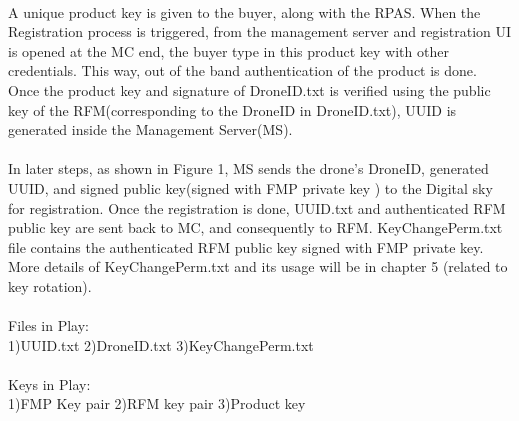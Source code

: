 \documentclass[18pt]{article}
\begin{document}
 \\
A unique product key is given to the buyer, along with the RPAS. When the Registration process is triggered, from the management server and registration UI is opened at the MC end, the buyer type in this product key with other credentials. This way, out of the band authentication of the product is done.
Once the product key and signature of DroneID.txt is verified using the public key of the RFM(corresponding to the DroneID in DroneID.txt), UUID is generated inside the Management Server(MS).\\
\\
In later steps, as shown in Figure 1, MS sends the drone's DroneID, generated UUID, and signed public key(signed with FMP private key ) to the Digital sky for registration. Once the registration is done, UUID.txt and authenticated RFM public key are sent back to MC, and consequently to RFM. KeyChangePerm.txt file contains the authenticated RFM public key signed with FMP private key.
More details of KeyChangePerm.txt and its usage will be in chapter 5 (related to key rotation).\\
\\
Files in Play:\\
1)UUID.txt 
2)DroneID.txt 
3)KeyChangePerm.txt\\
\\
 Keys in Play:\\
1)FMP Key pair 
2)RFM key pair 
3)Product key
\end{document}
